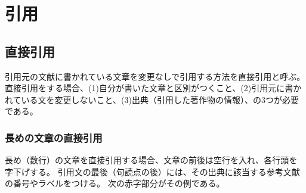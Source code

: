 \chapter{引用}

\begin{comment}
    \begin{textblock}{2}(1, 16.5)
        空行→
    \end{textblock}
    
    \begin{textblock}{2}(1, 18.5)
        字下げ→
    \end{textblock}
        
    \begin{textblock}{2}(1, 20.5)
        空行→
    \end{textblock}
    
    \begin{textblock}{11}(9, 20.5)
        ←読点までが元の文なので文献番号はその後につける
    \end{textblock}
    
    \begin{textblock}{7}(14, 26.5)
        ↑同じく読点までが元の文なので
    
        "」"と文献番号はその後につける
    \end{textblock}
\end{comment}


\section{直接引用}

引用元の文献に書かれている文章を変更なしで引用する方法を直接引用と呼ぶ。
直接引用をする場合、(1)自分が書いた文章と区別がつくこと、(2)引用元に書かれている文を変更しないこと、(3)出典（引用した著作物の情報）、の3つが必要である。

\subsection{長めの文章の直接引用}

長め（数行）の文章を直接引用する場合、文章の前後は空行を入れ、各行頭を字下げする。
引用文の最後（句読点の後）には、その出典に該当する参考文献の番号やラベルをつける。
次の赤字部分がその例である。


